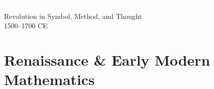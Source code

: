 
{
\begin{frame}[plain]
  \centering
  \vfill
  \textcolor{white}{\Huge\bfseries The Modern Age Begins}\\[0.7em]
  \textcolor{white!85}{\Large Revolution in Symbol, Method, and Thought}\\[1.5em]
  \textcolor{white!65}{\large 1500--1700 CE}
  \vfill
  \vfill
\end{frame}
}

\section{Renaissance \& Early Modern Mathematics}

